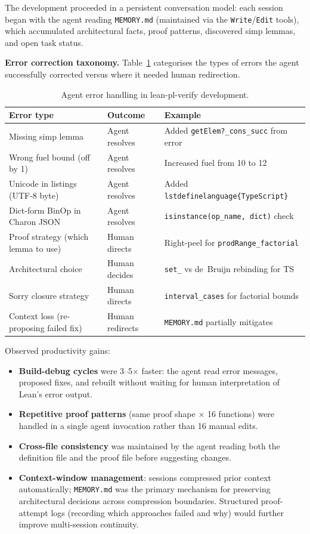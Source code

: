 The development proceeded in a persistent conversation model: each session
began with the agent reading \texttt{MEMORY.md} (maintained via the
\texttt{Write}/\texttt{Edit} tools), which accumulated architectural facts,
proof patterns, discovered simp lemmas, and open task status.

\textbf{Error correction taxonomy.}
Table~\ref{tab:errors} categorises the types of errors the agent successfully
corrected versus where it needed human redirection.

\begin{table}[h]
\centering
\small
\caption{Agent error handling in lean-pl-verify development.}
\label{tab:errors}
\begin{tabular}{@{}lll@{}}
\toprule
\textbf{Error type} & \textbf{Outcome} & \textbf{Example} \\
\midrule
Missing simp lemma & Agent resolves & Added \texttt{getElem?\_cons\_succ} from error \\
Wrong fuel bound (off by 1) & Agent resolves & Increased fuel from 10 to 12 \\
Unicode in listings (UTF-8 byte) & Agent resolves & Added \texttt{lstdefinelanguage\{TypeScript\}} \\
Dict-form BinOp in Charon JSON & Agent resolves & \texttt{isinstance(op\_name, dict)} check \\
\midrule
Proof strategy (which lemma to use) & Human directs & Right-peel for \texttt{prodRange\_factorial} \\
Architectural choice & Human decides & \texttt{set\_} vs de~Bruijn rebinding for TS \\
Sorry closure strategy & Human directs & \texttt{interval\_cases} for factorial bounds \\
Context loss (re-proposing failed fix) & Human redirects & \texttt{MEMORY.md} partially mitigates \\
\bottomrule
\end{tabular}
\end{table}

Observed productivity gains:
\begin{itemize}[leftmargin=2em]
  \item \textbf{Build-debug cycles} were 3--5$\times$ faster: the agent
        read error messages, proposed fixes, and rebuilt without waiting for
        human interpretation of Lean's error output.
  \item \textbf{Repetitive proof patterns} (same proof shape × 16 functions)
        were handled in a single agent invocation rather than 16 manual edits.
  \item \textbf{Cross-file consistency} was maintained by the agent reading
        both the definition file and the proof file before suggesting changes.
  \item \textbf{Context-window management}: sessions compressed prior context
        automatically; \texttt{MEMORY.md} was the primary mechanism for
        preserving architectural decisions across compression boundaries.
        Structured proof-attempt logs (recording which approaches failed and why)
        would further improve multi-session continuity.
\end{itemize}

